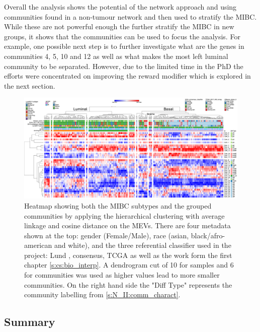 Overall the analysis shows the potential of the network approach and using communities found in a non-tumour network and then used to stratify the MIBC. While these are not powerful enough the further stratify the MIBC in new groups, it shows that the communities can be used to focus the analysis. For example, one possible next step is to further investigate what are the genes in communities 4, 5, 10 and 12 as well as what makes the most left luminal community to be separated. However, due to the limited time in the PhD the efforts were concentrated on improving the reward modifier which is explored in the next section.

\begin{figure}
    \includegraphics[width=1.0\textwidth,keepaspectratio]{Sections/Network_II/resources/non_tum/iMev_3_3_cs_13_horiz.png}
    
    \caption{Heatmap showing both the MIBC subtypes and the grouped communities by applying the hierarchical clustering with average linkage and cosine distance on the MEVs. There are four metadata shown at the top: gender (Female/Male), race (asian, black/afro-american and white), and the three referential classifier used in the project: Lund \citet{Marzouka2018-ge}, consensus\citet{Kamoun2020-tj}, TCGA \citet{Robertson2017-mg} as well as the work form the first chapter \cref{s:cs:bio_interp}. A dendrogram cut of 10 for samples and 6 for communities was used as higher values lead to more smaller communities. On the right hand side the "Diff Type" represents the community labelling from \cref{s:N_II:comm_charact}.
    }
    \label{fig:N_II:tum_morph}
\end{figure}


\subsection{Summary}


